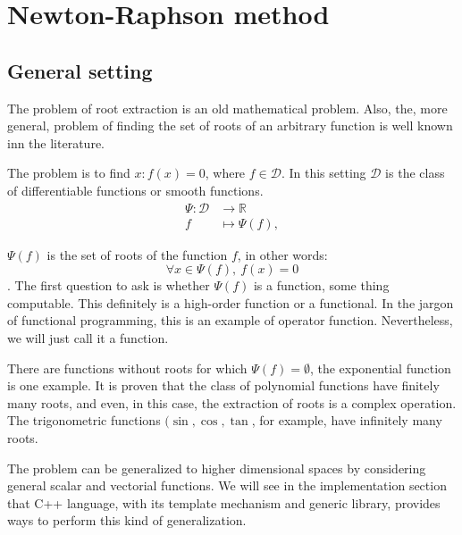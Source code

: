 \documentclass[12pt]{article}
\begin{document}
  
  \maketitle
  
  \section{Newton-Raphson method}
  	\subsection {General setting}
  		The problem of root extraction is an old mathematical problem.  
  		Also, the, more general, problem of finding the set of roots of an arbitrary function is well known inn the literature.  
   
  		The problem is to find \( x : f(x) =0\), where   \( f \in  \mathcal{D}\). In this setting \( \mathcal{D}\)  is the class of differentiable functions or smooth functions.
  			\begin{align} \label{eq:functional}
  				 \Psi \colon  \mathcal{D}   &\to \mathbb{R} \nonumber\\
  			 	f &\mapsto \Psi(f),
  			\end{align}
  
  		\(\Psi(f) \) is the set of roots of the function \( f \), in other words: \[ \forall  x \in \Psi(f),~f(x) =0\].
  		The first question to ask is whether \(\Psi(f) \) is a function, some thing computable. This definitely is a high-order function or a functional. 
  		In the jargon of functional programming, this is an example of operator function.  Nevertheless, we will just call it a function.  
  
  		There are functions without roots for which \( \Psi(f) = \emptyset \), the exponential function is one example.  
  		It is proven that the class of polynomial functions have finitely many roots, and even, in this case, the extraction of roots is a complex operation.
  		The trigonometric functions \((\sin, \cos,\tan\), for example, have infinitely many roots. 
  		
  		The problem can be generalized to higher dimensional spaces by considering general scalar and vectorial functions.  
  		We will see in the implementation section that C++ language, with its template mechanism and generic library, provides ways to perform this kind of generalization.
  
  
\end{document}
